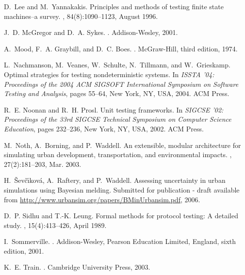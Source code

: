 \documentclass{sig-alternate}
\begin{document}
\begin{thebibliography}{10}
D.~Lee and M.~Yannakakis.
\newblock Principles and methods of testing finite state machines--a survey.
, 84(8):1090--1123, August 1996.

J.~D. McGregor and D.~A. Sykes.
.
\newblock Addison-Wesley, 2001.

A.~Mood, F.~A. Graybill, and D.~C. Boes.
.
\newblock McGraw-Hill, third edition, 1974.

L.~Nachmanson, M.~Veanes, W.~Schulte, N.~Tillmann, and W.~Grieskamp.
\newblock Optimal strategies for testing nondeterministic systems.
\newblock In {\em ISSTA '04: Proceedings of the 2004 ACM SIGSOFT International
  Symposium on Software Testing and Analysis}, pages 55--64, New York, NY, USA,
  2004. ACM Press.

\newpage

R.~E. Noonan and R.~H. Prosl.
\newblock Unit testing frameworks.
\newblock In {\em SIGCSE '02: Proceedings of the 33rd SIGCSE Technical
  Symposium on Computer Science Education}, pages 232--236, New York, NY, USA,
  2002. ACM Press.

M.~Noth, A.~Borning, and P.~Waddell.
\newblock An extensible, modular architecture for simulating urban development,
  transportation, and environmental impacts.
, 27(2):181--203, Mar.
  2003.

H.~{\v{S}}ev\v{c}\'{\i}kov\'{a}, A.~Raftery, and P.~Waddell.
\newblock Assessing uncertainty in urban simulations using {Bayesian} melding.
\newblock Submitted for publication - draft available from
  \url{http://www.urbansim.org/papers/BMinUrbansim.pdf}, 2006.

D.~P. Sidhu and T.-K. Leung.
\newblock Formal methods for protocol testing: A detailed study.
, 15(4):413--426,
  April 1989.

I.~Sommerville.
.
\newblock Addison-Wesley, Pearson Education Limited, England, sixth edition,
  2001.

\newpage

K.~E. Train.
.
\newblock Cambridge University Press, 2003.


\end{thebibliography}
\end{document}
